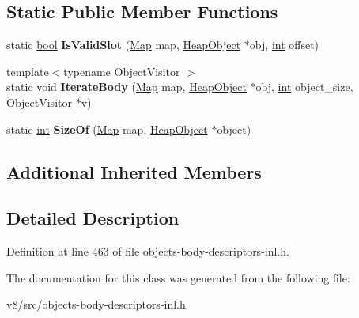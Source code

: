 \subsection*{Static Public Member Functions}
\begin{DoxyCompactItemize}
\item 
\mbox{\label{classv8_1_1internal_1_1JSWeakCollection_1_1BodyDescriptorImpl_aa59b6beeede5fa5be5a2c9f4c841e1f4}} 
static \mbox{\hyperlink{classbool}{bool}} {\bfseries Is\+Valid\+Slot} (\mbox{\hyperlink{classv8_1_1internal_1_1Map}{Map}} map, \mbox{\hyperlink{classv8_1_1internal_1_1HeapObject}{Heap\+Object}} $\ast$obj, \mbox{\hyperlink{classint}{int}} offset)
\item 
\mbox{\label{classv8_1_1internal_1_1JSWeakCollection_1_1BodyDescriptorImpl_ad601947f062d44cd6efd6594059a10fa}} 
{\footnotesize template$<$typename Object\+Visitor $>$ }\\static void {\bfseries Iterate\+Body} (\mbox{\hyperlink{classv8_1_1internal_1_1Map}{Map}} map, \mbox{\hyperlink{classv8_1_1internal_1_1HeapObject}{Heap\+Object}} $\ast$obj, \mbox{\hyperlink{classint}{int}} object\+\_\+size, \mbox{\hyperlink{classv8_1_1internal_1_1ObjectVisitor}{Object\+Visitor}} $\ast$v)
\item 
\mbox{\label{classv8_1_1internal_1_1JSWeakCollection_1_1BodyDescriptorImpl_a13b08b6ee8860b708df4e5f86492cc76}} 
static \mbox{\hyperlink{classint}{int}} {\bfseries Size\+Of} (\mbox{\hyperlink{classv8_1_1internal_1_1Map}{Map}} map, \mbox{\hyperlink{classv8_1_1internal_1_1HeapObject}{Heap\+Object}} $\ast$object)
\end{DoxyCompactItemize}
\subsection*{Additional Inherited Members}


\subsection{Detailed Description}


Definition at line 463 of file objects-\/body-\/descriptors-\/inl.\+h.



The documentation for this class was generated from the following file\+:\begin{DoxyCompactItemize}
\item 
v8/src/objects-\/body-\/descriptors-\/inl.\+h\end{DoxyCompactItemize}
